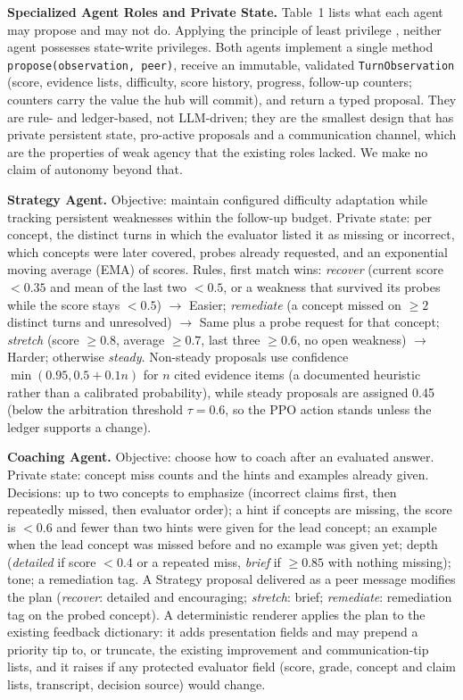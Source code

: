 \documentclass[runningheads]{llncs}
\begin{document}
\textbf{Specialized Agent Roles and Private State.} Table~1 lists what each agent may propose and may not do. Applying the principle of least privilege \cite{saltzer1975}, neither agent possesses state-write privileges. Both agents implement a single method \texttt{propose(observation, peer)}, receive an immutable, validated \texttt{TurnObservation} (score, evidence lists, difficulty, score history, progress, follow-up counters; counters carry the value the hub will commit), and return a typed proposal. They are rule- and ledger-based, not LLM-driven; they are the smallest design that has private persistent state, pro-active proposals and a communication channel, which are the properties of weak agency \cite{wooldridge1995} that the existing roles lacked. We make no claim of autonomy beyond that.

\textbf{Strategy Agent.} Objective: maintain configured difficulty adaptation while tracking persistent weaknesses within the follow-up budget. Private state: per concept, the distinct turns in which the evaluator listed it as missing or incorrect, which concepts were later covered, probes already requested, and an exponential moving average (EMA) of scores. Rules, first match wins: \emph{recover} (current score $<0.35$ and mean of the last two $<0.5$, or a weakness that survived its probes while the score stays $<0.5$) $\rightarrow$ Easier; \emph{remediate} (a concept missed on $\geq 2$ distinct turns and unresolved) $\rightarrow$ Same plus a probe request for that concept; \emph{stretch} (score $\geq 0.8$, average $\geq 0.7$, last three $\geq 0.6$, no open weakness) $\rightarrow$ Harder; otherwise \emph{steady}. Non-steady proposals use confidence $\min(0.95, 0.5+0.1n)$ for $n$ cited evidence items (a documented heuristic rather than a calibrated probability), while steady proposals are assigned 0.45 (below the arbitration threshold $\tau=0.6$, so the PPO action stands unless the ledger supports a change).

\textbf{Coaching Agent.} Objective: choose how to coach after an evaluated answer. Private state: concept miss counts and the hints and examples already given. Decisions: up to two concepts to emphasize (incorrect claims first, then repeatedly missed, then evaluator order); a hint if concepts are missing, the score is $<0.6$ and fewer than two hints were given for the lead concept; an example when the lead concept was missed before and no example was given yet; depth (\emph{detailed} if score $<0.4$ or a repeated miss, \emph{brief} if $\geq 0.85$ with nothing missing); tone; a remediation tag. A Strategy proposal delivered as a peer message modifies the plan (\emph{recover}: detailed and encouraging; \emph{stretch}: brief; \emph{remediate}: remediation tag on the probed concept). A deterministic renderer applies the plan to the existing feedback dictionary: it adds presentation fields and may prepend a priority tip to, or truncate, the existing improvement and communication-tip lists, and it raises if any protected evaluator field (score, grade, concept and claim lists, transcript, decision source) would change.
\end{document}
